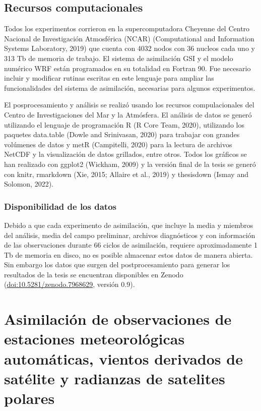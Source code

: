 \documentclass[12pt,oneside,a4paper]{reedthesis}
\begin{document}
\hypertarget{recursos-computacionales}{%
\section{Recursos computacionales}\label{recursos-computacionales}}

Todos los experimentos corrieron en la supercomputadora Cheyenne del Centro Nacional de Investigación Atmosférica (NCAR) (Computational and Information Systems Laboratory, 2019) que cuenta con 4032 nodos con 36 nucleos cada uno y 313 Tb de memoria de trabajo. El sistema de asimilación GSI y el modelo numérico WRF están programados en su totalidad en Fortran 90. Fue necesario incluir y modificar rutinas escritas en este lenguaje para ampliar las funcionalidades del sistema de asimilación, necesarias para algunos experimentos.

El posprocesamiento y análisis se realizó usando los recursos compulacionales del Centro de Investigaciones del Mar y la Atmósfera. El análisis de datos se generó utilizando el lenguaje de programación R (R Core Team, 2020), utilizando los paquetes data.table (Dowle and Srinivasan, 2020) para trabajar con grandes volúmenes de datos y metR (Campitelli, 2020) para la lectura de archivos NetCDF y la visualización de datos grillados, entre otros.
Todos los gráficos se han realizado con ggplot2 (Wickham, 2009) y la versión final de la tesis se generó con knitr, rmarkdown (Xie, 2015; Allaire et al., 2019) y thesisdown (Ismay and Solomon, 2022).

\hypertarget{disponibilidad-de-los-datos}{%
\subsection{Disponibilidad de los datos}\label{disponibilidad-de-los-datos}}

Debido a que cada experimento de asimilación, que incluye la media y miembros del análisis, media del campo preliminar, archivos diagnósticos y con información de las observaciones durante 66 ciclos de asimilación, requiere aproximadamente 1 Tb de memoria en disco, no es posible almacenar estos datos de manera abierta. Sin embargo los datos que surgen del postprocesamiento para generar los resultados de la tesis se encuentran disponibles en Zenodo (\url{doi:10.5281/zenodo.7968629}, versión 0.9).

\hypertarget{cap-3-analisis}{%
\chapter{Asimilación de observaciones de estaciones meteorológicas automáticas, vientos derivados de satélite y radianzas de satelites polares}\label{cap-3-analisis}}
\end{document}
